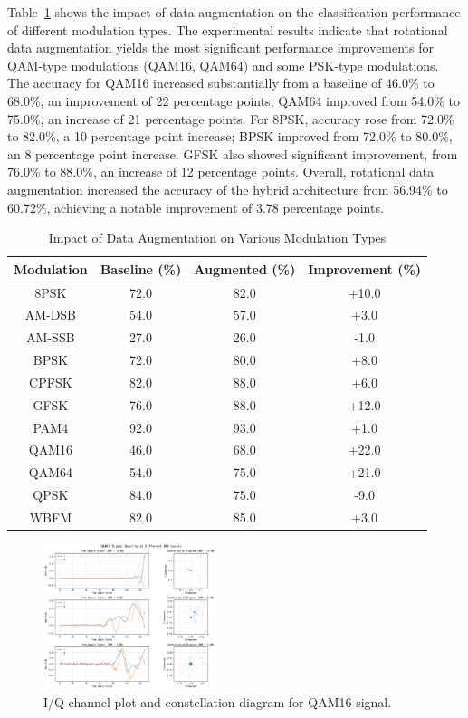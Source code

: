 \documentclass[conference]{IEEEtran}
\begin{document}
Table~\ref{tab:data_augmentation_results} shows the impact of data augmentation on the classification performance of different modulation types. The experimental results indicate that rotational data augmentation yields the most significant performance improvements for QAM-type modulations (QAM16, QAM64) and some PSK-type modulations. The accuracy for QAM16 increased substantially from a baseline of 46.0\% to 68.0\%, an improvement of 22 percentage points; QAM64 improved from 54.0\% to 75.0\%, an increase of 21 percentage points. For 8PSK, accuracy rose from 72.0\% to 82.0\%, a 10 percentage point increase; BPSK improved from 72.0\% to 80.0\%, an 8 percentage point increase. GFSK also showed significant improvement, from 76.0\% to 88.0\%, an increase of 12 percentage points. Overall, rotational data augmentation increased the accuracy of the hybrid architecture from 56.94\% to 60.72\%, achieving a notable improvement of 3.78 percentage points.

\begin{table}[!htbp]
\centering
\caption{Impact of Data Augmentation on Various Modulation Types}
\label{tab:data_augmentation_results}
\begin{tabular}{@{}cccc@{}}
\toprule
Modulation & Baseline (\%) & Augmented (\%) & Improvement (\%) \\
\midrule
8PSK     & 72.0  & 82.0  & +10.0 \\
AM-DSB   & 54.0  & 57.0  & +3.0  \\
AM-SSB   & 27.0  & 26.0  & -1.0  \\
BPSK     & 72.0  & 80.0  & +8.0  \\
CPFSK    & 82.0  & 88.0  & +6.0  \\
GFSK     & 76.0  & 88.0  & +12.0 \\
PAM4     & 92.0  & 93.0  & +1.0  \\
QAM16    & 46.0  & 68.0  & +22.0 \\
QAM64    & 54.0  & 75.0  & +21.0 \\
QPSK     & 84.0  & 75.0  & -9.0  \\
WBFM     & 82.0  & 85.0  & +3.0  \\
\bottomrule
\end{tabular}
\end{table}

\begin{figure}[htbp]
\centering
\includegraphics[width=0.45\textwidth]{figure/QAM16_rotation.png}
\caption{I/Q channel plot and constellation diagram for QAM16 signal.}
\label{fig:rotation_augmentation}
\end{figure}
\end{document}
